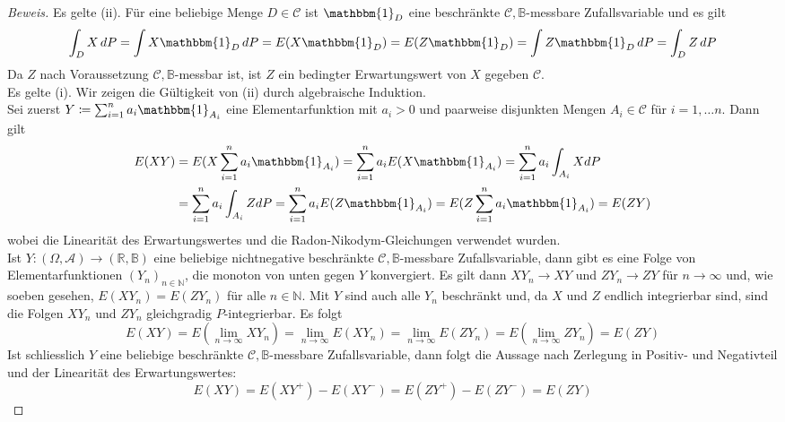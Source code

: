 \documentclass[10pt]{article}
\begin{document}
\begin{proof}[Beweis]  
Es gelte (ii). Für eine beliebige Menge $D \in \mathcal{C}$ ist $\mathbbm{1}_D$ eine beschränkte $\mathcal{C},\mathbb{B}$-messbare Zufallsvariable und es gilt
$$
\int_{D} X \,dP = \int X \mathbbm{1}_D \,dP = E(X \mathbbm{1}_D) = E(Z \mathbbm{1}_D) =  \int Z \mathbbm{1}_D \,dP = \int_{D} Z \,dP
$$
Da $Z$ nach Voraussetzung $\mathcal{C},\mathbb{B}$-messbar ist, ist $Z$ ein bedingter Erwartungswert von $X$ gegeben $\mathcal{C}$. \\

Es gelte (i). Wir zeigen die Gültigkeit von (ii) durch algebraische Induktion. \\
Sei zuerst $Y \coloneqq \sum_{i=1}^{n} a_i \mathbbm{1}_{A_i}$ eine Elementarfunktion mit $a_i > 0$ und paarweise disjunkten Mengen $A_i \in \mathcal{C}$ für $i=1, \dots n$. Dann gilt
\begin{align*}
E(XY) &= E(X  \sum_{i=1}^{n} a_i \mathbbm{1}_{A_i}) =  \sum_{i=1}^{n} a_i E(X \mathbbm{1}_{A_i}) =  \sum_{i=1}^{n} a_i \int_{A_i} X dP \\
	  &=  \sum_{i=1}^{n} a_i \int_{A_i} Z dP =  \sum_{i=1}^{n} a_i E(Z \mathbbm{1}_{A_i}) =  E(Z \sum_{i=1}^{n} a_i \mathbbm{1}_{A_i}) = E(ZY) 
\end{align*}
wobei die Linearität des Erwartungswertes und die Radon-Nikodym-Gleichungen verwendet wurden. \\
Ist $Y:(\Omega, \mathcal{A}) \rightarrow (\mathbb{R}, \mathbb{B})$ eine beliebige nichtnegative beschränkte $\mathcal{C},\mathbb{B}$-messbare Zufallsvariable, dann gibt es eine Folge von Elementarfunktionen $(Y_n)_{n \in \mathbb{N}}$, die monoton von unten gegen $Y$ konvergiert. Es gilt dann $XY_n \rightarrow XY$ und $ZY_n \rightarrow ZY$ für $n \to \infty$ und, wie soeben gesehen, $E(XY_n) = E(ZY_n)$ für alle $n \in \mathbb{N}$. Mit $Y$ sind auch alle $Y_n$ beschränkt und, da $X$ und $Z$ endlich integrierbar sind, sind die Folgen $XY_n$ und $ZY_n$ gleichgradig $P$-integrierbar. Es folgt
$$
E(XY) = E( \lim_{n \to \infty} XY_n) =  \lim_{n \to \infty} E(X Y_n) =  \lim_{n \to \infty} E(Z Y_n) = E(\lim_{n \to \infty} ZY_n) = E(ZY)
$$
Ist schliesslich $Y$ eine beliebige beschränkte $\mathcal{C},\mathbb{B}$-messbare Zufallsvariable, dann folgt die Aussage nach Zerlegung in Positiv- und Negativteil und der Linearität des Erwartungswertes:
$$
E(XY) = E(XY^+)-E(XY^-) = E(ZY^+)-E(ZY^-) = E(ZY) 
$$
 
\end{proof}
 
\end{document}
